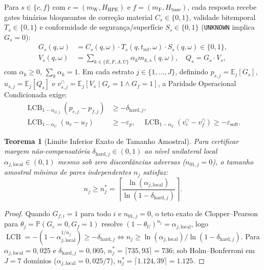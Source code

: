 \documentclass[10pt,twocolumn]{article}
\newtheorem{theorem}{Teorema}
\begin{document}
Para $s \in \{c, f\}$ com $c=(m_{\mathrm{W}}, H_{\mathrm{HPE}})$ e $f=(m_{\mathrm{F}}, H_{\mathrm{base}})$, cada resposta recebe gates bin\'arios bloqueantes de corre\c{c}\~ao material $C_s \in \{0,1\}$, validade bitemporal $T_s \in \{0,1\}$ e conformidade de seguran\c{c}a/superf\'icie $S_s \in \{0,1\}$ (\texttt{UNKNOWN} implica $G_s=0$):
\begin{align}
G_s(q,\omega) &= C_s(q,\omega)\cdot T_s(q,t_{\mathrm{ref}},\omega)\cdot S_s(q,\omega) \in \{0,1\}, \\
V_s(q,\omega) &= \sum_{k \in \{E,F,A,U\}} \alpha_k m_{k,s}(q,\omega), \quad Q_s = G_s \cdot V_s,
\end{align}
com $\alpha_k \ge 0$, $\sum_k \alpha_k = 1$. Em cada estrato $j \in \{1,\dots,J\}$, definindo $p_{s,j}=\mathbb{E}_j[G_s]$, $u_{s,j}=\mathbb{E}_j[Q_s]$ e $v_{s,j}^{\cap}=\mathbb{E}_j[V_s \mid G_c=1 \land G_f=1]$, a Paridade Operacional Condicionada exige:
\begin{equation}
\begin{aligned}
\operatorname{LCB}_{1-\alpha_{G,j}}(p_{c,j}-p_{f,j}) &\ge -\delta_{\mathrm{hard},j}, \\
\operatorname{LCB}_{1-\alpha_U}(u_c-u_f) &\ge -\varepsilon_p, \quad
\operatorname{LCB}_{1-\alpha_V}(v_c^{\cap}-v_f^{\cap}) \ge -\varepsilon_{\mathrm{soft}}.
\end{aligned}
\end{equation}

\begin{theorem}[Limite Inferior Exato de Tamanho Amostral]
Para certificar margem n\~ao-compensat\'oria $\delta_{\mathrm{hard},j} \in (0,1)$ ao n\'ivel unilateral local $\alpha_{j,\mathrm{local}} \in (0,1)$ mesmo sob zero discord\^ancias adversas ($n_{01,j}=0$), o tamanho amostral m\'inimo de pares independentes $n_j$ satisfaz:
\begin{equation}
n_j \ge n_j^* = \left\lceil \frac{\ln(\alpha_{j,\mathrm{local}})}{\ln(1 - \delta_{\mathrm{hard},j})} \right\rceil.
\end{equation}
\end{theorem}
\begin{proof}
Quando $G_{f,i}=1$ para todo $i$ e $n_{01,j}=0$, o teto exato de Clopper--Pearson \cite{clopper1934use} para $\theta_j = \mathbb{P}(G_c=0,G_f=1)$ resolve $(1-\theta_U)^{n_j}=\alpha_{j,\mathrm{local}}$, logo $\operatorname{LCB} = -(1-\alpha_{j,\mathrm{local}}^{1/n_j}) \ge -\delta_{\mathrm{hard},j} \iff n_j \ge \ln(\alpha_{j,\mathrm{local}})/\ln(1-\delta_{\mathrm{hard},j})$. Para $\alpha_{j,\mathrm{local}}=0,025$ e $\delta_{\mathrm{hard},j}=0,005$, $n_j^* = \lceil 735,93 \rceil = 736$; sob Holm--Bonferroni \cite{holm1979simple} em $J=7$ dom\'inios ($\alpha_{j,\mathrm{local}}=0,025/7$), $n_j^* = \lceil 1.124,39 \rceil = 1.125$.
\end{proof}
\end{document}
